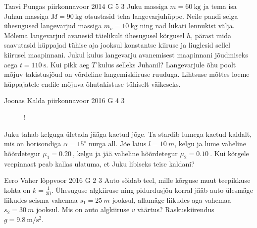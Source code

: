 \documentclass[11pt]{article}
\begin{document}
{%
{Taavi Pungas} %
{piirkonnavoor} %
{2014} %
{G 5} %
{3} %
{
\ifStatement
Juku massiga $m=\SI{60}{\kg}$ ja tema isa Juhan massiga $M=\SI{90}{\kg}$ otsustasid teha langevarjuhüppe. Neile pandi selga ühesugused langevarjud massiga $m_v=\SI{10}{\kg}$ ning nad lükati lennukist välja. Mõlema langevarjud avanesid täielikult ühesugusel kõrgusel $h$, pärast mida saavutasid hüppajad tühise aja jooksul konstantse kiiruse ja liuglesid sellel kiirusel maapinnani. Jukul kulus langevarju avanemisest maapinnani jõudmiseks aega $t=\SI{110}{\s}$. Kui pikk aeg $T$ kulus selleks Juhanil? Langevarjule õhu poolt mõjuv takistusjõud on võrdeline langemiskiiruse ruuduga. Lihtsuse mõttes loeme hüppajatele endile mõjuva õhutakistuse tühiselt väikeseks.
\fi
}

{Joonas Kalda} %
{piirkonnavoor} %
{2016} %
{G 4} %
{3} %
{
\ifStatement
\begin{figure}
	\vspace{-12pt}
	\begin{resizebox}{\linewidth}{!}{
	}
	\end{resizebox}
\end{figure}

Juku tahab kelguga ületada jääga kaetud jõge. Ta stardib lumega kaetud kaldalt, mis on horisondiga $\alpha = 15^{\circ}$ nurga all. Jõe laius $l = \SI{10}{m}$, kelgu ja lume vaheline hõõrdetegur $\mu_1 = \SI{0.20}{}$, kelgu ja jää vaheline hõõrdetegur $\mu_2 = \SI{0.10}{}$. Kui kõrgele veepinnast peab kallas ulatuma, et Juku libiseks teise kaldani?
\fi
}

{Eero Vaher} %
{lõppvoor} %
{2016} %
{G 2} %
{3} %
{
\ifStatement
Auto sõidab teel, mille kõrguse muut teepikkuse kohta on $k=\frac{1}{30}$. Ühesuguse algkiiruse ning pidurdusjõu korral jääb auto ülesmäge liikudes seisma vahemaa $s_1=\SI{25}{m}$ jooksul, allamäge liikudes aga vahemaa $s_2=\SI{30}{m}$ jooksul. Mis on auto algkiiruse $v$ väärtus? Raskuskiirendus $g=\SI{9.8}{\meter\per\second\squared}$.
\fi
}

}
\end{document}
